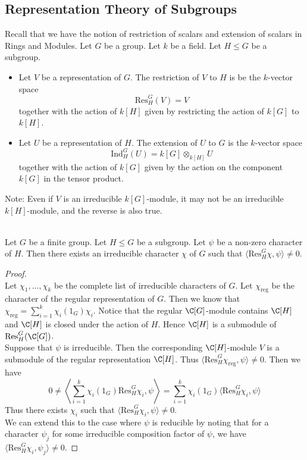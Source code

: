 \documentclass[a4paper]{article}
\begin{document}
\subsection{Representation Theory of Subgroups}
Recall that we have the notion of restriction of scalars and extension of scalars in Rings and Modules. Let $G$ be a group. Let $k$ be a field. Let $H\leq G$ be a subgroup. 
\begin{itemize}
\item Let $V$ be a representation of $G$. The restriction of $V$ to $H$ is be the $k$-vector space $$\text{Res}_H^G(V)=V$$ together with the action of $k[H]$ given by restricting the action of $k[G]$ to $k[H]$. 
\item Let $U$ be a representation of $H$. The extension of $U$ to $G$ is the $k$-vector space $$\text{Ind}_H^G(U)=k[G]\otimes_{k[H]}U$$ together with the action of $k[G]$ given by the action on the component $k[G]$ in the tensor product. 
\end{itemize}

Note: Even if $V$ is an irreducible $k[G]$-module, it may not be an irreducible $k[H]$-module, and the reverse is also true. 

\begin{prp}{}{}\\
Let $G$ be a finite group. Let $H\leq G$ be a subgroup. Let $\psi$ be a non-zero character of $H$. Then there exists an irreducible character $\chi$ of $G$ such that $\langle\text{Res}_H^G\chi,\psi\rangle\neq 0$. 
\begin{proof}\\
Let $\chi_1,\dots,\chi_k$ be the complete list of irreducible characters of $G$. Let $\chi_\text{reg}$ be the character of the regular representation of $G$. Then we know that $\chi_\text{reg}=\sum_{i=1}^k\chi_i(1_G)\chi_i$. Notice that the regular $\C[G]$-module contains $\C[H]$ and $\C[H]$ is closed under the action of $H$. Hence $\C[H]$ is a submodule of $\text{Res}_H^G(\C[G])$. \\

Suppose that $\psi$ is irreducible. Then the corresponding $\C[H]$-module $V$ is a submodule of the regular representation $\C[H]$. Thus $\langle\text{Res}_H^G\chi_\text{reg},\psi\rangle\neq 0$. Then we have $$0\neq\left\langle\sum_{i=1}^k\chi_i(1_G)\text{Res}_H^G\chi_i,\psi\right\rangle=\sum_{i=1}^k\chi_i(1_G)\langle\text{Res}_H^G\chi_i,\psi\rangle$$ Thus there exists $\chi_i$ such that $\langle\text{Res}_H^G\chi_i,\psi\rangle\neq 0$. \\

We can extend this to the case where $\psi$ is reducible by noting that for a character $\psi_j$ for some irreducible composition factor of $\psi$, we have $\langle\text{Res}_H^G\chi_i,\psi_j\rangle\neq 0$. 
\end{proof}
\end{prp}
\end{document}
